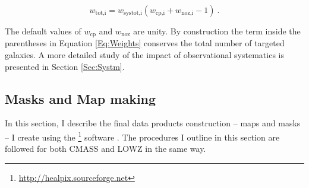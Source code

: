 \begin{equation}
w_{\text{tot,i}} = w_{\text{systot,i}}(w_{\text{cp,i}}+w_{\text{noz,i}}-1) \ .
\label{Eq:Weights}
\end{equation}

The default values of $w_{\text{cp}}$ and $w_{\text{noz}}$ are unity. By construction the term inside the parentheses in Equation \eqref{Eq:Weights} conserves the total number of targeted galaxies. A more detailed study of the impact of observational systematics is presented in Section \ref{Sec:Systm}.

\subsection{Masks and Map making}\label{Sec:MaskMaps}
In this section, I describe the final data products construction -- maps and masks -- I create using the \healpix\footnote{\url{http://healpix.sourceforge.net}} software \citep{Healpix}. The procedures I outline in this section are followed for both CMASS and LOWZ in the same way.

